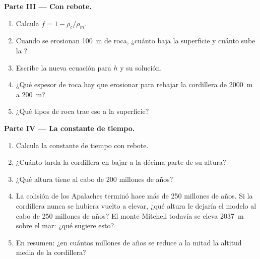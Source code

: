 \begin{problem}
\medskip
\noindent\textbf{Parte III --- Con rebote.}
\begin{enumerate}[resume]
  \item Calcula $f = 1 - \rho_c/\rho_m$.
  \item Cuando se erosionan \qty{100}{m} de roca, ¿cuánto baja la superficie
        y cuánto sube la ?
  \item Escribe la nueva ecuación para $h$ y su solución.
  \item ¿Qué espesor de roca hay que erosionar para rebajar la cordillera de
        \qty{2000}{m} a \qty{200}{m}?
  \item ¿Qué tipos de roca trae eso a la superficie?
\end{enumerate}

\medskip
\noindent\textbf{Parte IV --- La constante de tiempo.}
\begin{enumerate}[resume]
  \item Calcula la constante de tiempo con rebote.
  \item ¿Cuánto tarda la cordillera en bajar a la décima parte de su altura?
  \item ¿Qué altura tiene al cabo de 200 millones de años?
  \item La colisión de los Apalaches terminó hace más de 250 millones de años.
        Si la cordillera nunca se hubiera vuelto a elevar, ¿qué altura le
        dejaría el modelo al cabo de 250 millones de años? El monte Mitchell
        todavía se eleva \qty{2037}{m} sobre el mar: ¿qué sugiere esto?
  \item En resumen: ¿en cuántos millones de años se reduce a la mitad la
        altitud media de la cordillera?
\end{enumerate}
\end{problem}
